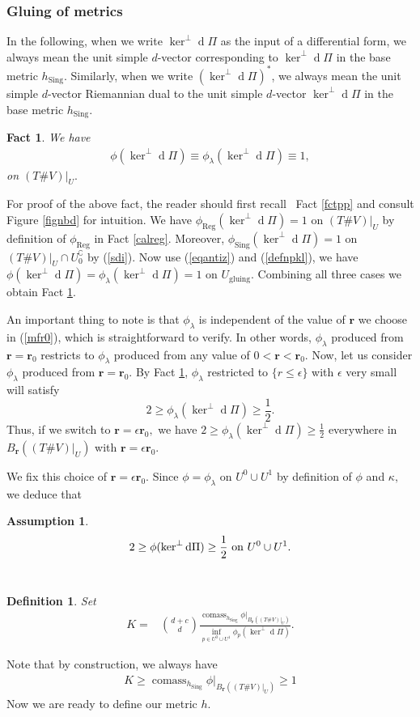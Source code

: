 \documentclass[11pt,a4paper]{amsart}
\numberwithin{equation}{section}
\newcommand{\reg}{{\operatorname{Reg}}}
\newcommand{\sing}{{\operatorname{Sing}}}
\newcommand{\e}{\epsilon}
\newcommand{\lam}{\lambda}
\newcommand{\cms}{\operatorname{comass}}
\newcommand{\ug}{U_{\operatorname{gluing}}}
\newcommand{\cp}{^\complement}
\newcommand{\kp}{\ker \ed\Pi}
\newcommand{\kn}{\ker^\perp \ed\Pi}
\newcommand{\ed}{{\operatorname{d}}}
\newcommand{\du}{^\ast}
\newcommand{\ka}{\kappa}
\newcommand{\mfr}{{\mathbf{r}}}
\newcommand{\tvu}{(T\#V)|_U}
\newcommand{\ur}{B_{\mfr}(\tvu)}
\theoremstyle{plain}
\newtheorem{fact}[exam]{Fact}
\newtheorem{assump}[exam]{Assumption}
\newtheorem{defn}[exam]{Definition}
\theoremstyle{definition}
\numberwithin{equation}{subsection}
\begin{document}
	\subsubsection{Gluing of metrics}
	In the following, when we write $\ker^\perp \ed\Pi$ as the input of a differential form, we always mean the unit simple $d$-vector corresponding to $\kn$ in the base metric $h_\sing.$ Similarly, when we write $(\kn)\du$, we always mean the unit simple $d$-vector Riemannian dual to the unit simple $d$-vector $\kn$ in the base metric $h_\sing.$
	\begin{fact}\label{fctp1}
		We have
		\begin{align*}
			\phi(\kn)\equiv \phi_\lam(\kn)\equiv 1,
		\end{align*}on $\tvu.$
	\end{fact}
	For proof of the above fact, the reader should first recall  Fact \ref{fctpp} and consult Figure \ref{fignbd} for intuition. We have $\phi_\reg(\kn)=1$ on $\tvu$ by definition of $\phi_\reg$ in Fact \ref{calreg}. Moreover, $\phi_\sing(\kn)=1$ on $\tvu\cap U_0\cp$ by (\ref{sdi}). Now use (\ref{eqantiz}) and (\ref{defnpkl}), we have $\phi(\kn)=\phi_\lam(\kn)=1$ on $\ug.$ Combining all three cases we obtain Fact \ref{fctp1}.
	
	An important thing to note is that $\phi_\lam$ is independent of the value of $\mfr$ we choose in (\ref{mfr0}), which is straightforward to verify. In other words, $\phi_\lam$ produced from $\mfr=\mfr_0$ restricts to $\phi_\lam$ produced from any value of $0<\mfr<\mfr_0$. Now, let us consider $\phi_\lam$ produced from $\mfr=\mfr_0.$ By Fact \ref{fctp1}, $\phi_\lam$ restricted to $\{r\le\e\}$ with $\e$ very small will satisfy 	$$2\ge\phi_\lam(\kn)\ge \frac{1}{2}.$$ Thus, if we switch to $\mfr=\e\mfr_0,$ we have $2\ge \phi_\lam(\kn)\ge \frac{1}{2}$ everywhere in $\ur$ with $\mfr=\e\mfr_0.$ 
	
	We fix this choice of $\mfr=\e\mfr_0$. Since $\phi=\phi_\lam$ on $U^0\cup U^1$ by definition of $\phi$ and $\ka,$ we deduce that
	\begin{assump}\label{philbd}
		\begin{align}
			2\ge	\phi(\kn)\ge \frac{1}{2}\textnormal{ on }U^0\cup U^1.
		\end{align}  
	\end{assump}
	\begin{defn}
		Set
		\begin{align}
			\label{defk}	K=&\binom{d+c}{d}\frac{\cms_{h_\sing}\phi|_{\ur}}{\inf_{p\in U^0\cup U^1}\phi_p(\kn)}.
		\end{align}
	\end{defn}
	Note that by construction, we always have
	\begin{align}\label{kineq}
		K\ge {\cms_{h_\sing}\phi|_{\ur}}\ge 1
	\end{align}
	Now we are ready to define our metric $h.$ 
	
\end{document}
